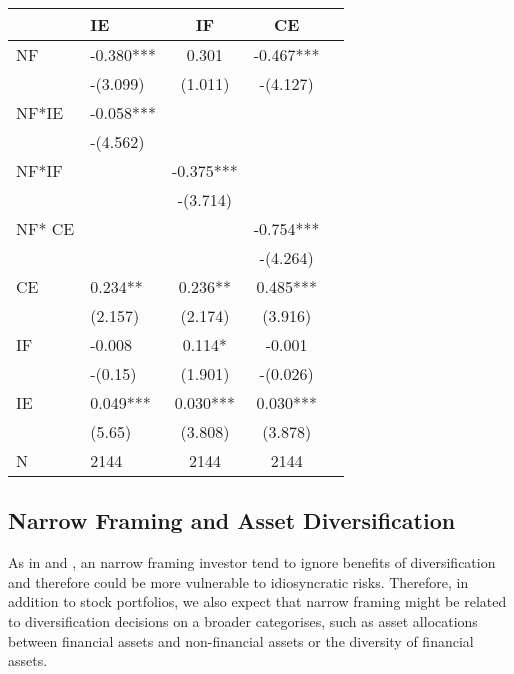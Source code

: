 \documentclass[ukenglish,nottitlepage,thmsb,11pt,letterpaper]{article}
\begin{document}
\begin{spacing}{1}
\begin{table}[H]
	\begin{tabular*}{\textwidth}{l @{\extracolsep{\fill}} lccc}
	    \toprule
	    & \textbf{IE}  & \textbf{IF}  & \textbf{CE} \\
	    \midrule
	    NF           & -0.380***       & 0.301        & -0.467*** \\
	    & -(3.099)     & (1.011)      & -(4.127) \\
	    NF*IE        & -0.058***       &              &  \\
	    & -(4.562)     &              &  \\
	    NF*IF        &              & -0.375***       &  \\
	    &              & -(3.714)     &  \\
	    NF* CE       &              &              & -0.754*** \\
	    &              &              & -(4.264) \\
	    CE           & 0.234**        & 0.236**        & 0.485*** \\
	    & (2.157)      & (2.174)      & (3.916) \\
	    IF           & -0.008       & 0.114*        & -0.001 \\
	    & -(0.15)      & (1.901)      & -(0.026) \\

	    IE           & 0.049***        & 0.030***        & 0.030*** \\
	    & (5.65)       & (3.808)      & (3.878) \\
	    \midrule
	    N            & 2144         & 2144         & 2144 \\
	    \bottomrule
	\end{tabular*}%
	\label{ddd}%
\end{table}%
\end{spacing}

 \subsection{Narrow Framing and Asset Diversification}
 
As in \citet{Barberis2006} and \cite{Barberis2009}, an narrow framing investor tend to ignore benefits of diversification and therefore could be more vulnerable to idiosyncratic risks. Therefore, in addition to stock portfolios, we also expect that narrow framing might be related to diversification decisions on a broader categorises, such as asset allocations between financial assets and non-financial assets or the diversity of financial assets. 
\end{document}
